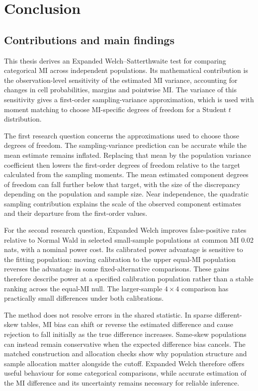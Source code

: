 \chapter{Conclusion}
\label{chap:conclusion}

\section{Contributions and main findings}

This thesis derives an Expanded Welch--Satterthwaite test for comparing
categorical MI across independent populations. Its mathematical
contribution is the observation-level sensitivity of the estimated MI
variance, accounting for changes in cell probabilities, margins and
pointwise MI. The variance of this sensitivity gives a first-order
sampling-variance approximation, which is used with moment matching to
choose MI-specific degrees of freedom for a Student \(t\) distribution.

The first research question concerns the approximations used to choose
those degrees of freedom. The sampling-variance prediction can be accurate
while the mean estimate remains inflated. Replacing that mean by the
population variance coefficient then lowers the first-order degrees of
freedom relative to the target calculated from the sampling moments.
The mean estimated component degrees of freedom can fall further below
that target, with the size of the discrepancy depending on the population
and sample size. Near independence, the quadratic sampling contribution
explains the scale of the observed component estimates and their departure
from the first-order values.

For the second research question, Expanded Welch improves false-positive
rates relative to Normal Wald in selected
small-sample populations at common MI 0.02 nats, with a nominal power
cost. Its calibrated power advantage is sensitive to the fitting
population: moving calibration to the upper equal-MI population reverses
the advantage in some fixed-alternative comparisons. These gains
therefore describe power at a specified calibration population rather
than a stable ranking across the equal-MI null. The larger-sample
\(4\times4\) comparison has practically small differences under both
calibrations.

The method does not resolve errors in the shared statistic. In sparse
different-skew tables, MI bias can shift or reverse the estimated
difference and cause rejection to fall initially as the true difference
increases. Same-skew populations can instead remain conservative when
the expected difference bias cancels. The matched construction and
allocation checks show why population structure and sample allocation
matter alongside the cutoff. Expanded Welch therefore offers useful
behaviour for some categorical comparisons, while accurate estimation
of the MI difference and its uncertainty remains necessary for reliable
inference.

